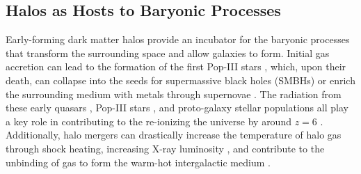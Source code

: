 \subsection{Halos as Hosts to Baryonic Processes}
\label{subsec:early_universe--baryonic_processes}


Early-forming dark matter halos provide an incubator for the baryonic processes that transform the surrounding space and allow galaxies to form.  Initial gas accretion can lead to the formation of the first Pop-III stars \citep{1986MNRAS.221...53C, 1997ApJ...474....1T, 2000ApJ...540...39A, 2002Sci...295...93A}, which, upon their death, can collapse into the seeds for supermassive black holes (SMBHs) \citep{2001ApJ...551L..27M, 2003MNRAS.340..647I, 2009ApJ...701L.133A, 2012ApJ...754...34J} or enrich the surrounding medium with metals through supernovae \citep{2002ApJ...567..532H, 2003ApJ...591..288H}.  The radiation from these early quasars \citep{1987ApJ...321L.107S, 1999ApJ...514..648M, 2001AJ....122.2833F}, Pop-III stars \citep{1997ApJ...486..581G, 2003ApJ...584..621V, 2006ApJ...639..621A}, and proto-galaxy stellar populations \citep{2012ApJ...752L...5B, 2012MNRAS.423..862K} all play a key role in contributing to the re-ionizing the universe by around $z = 6$ \citep{2001PhR...349..125B}.  Additionally, halo mergers can drastically increase the temperature of halo gas through shock heating, increasing X-ray luminosity \citep{2009MNRAS.397..190S}, and contribute to the unbinding of gas to form the warm-hot intergalactic medium \citep{2008SSRv..134..141B, 2010MNRAS.405L..31S, 2012MNRAS.425.2974T}.





